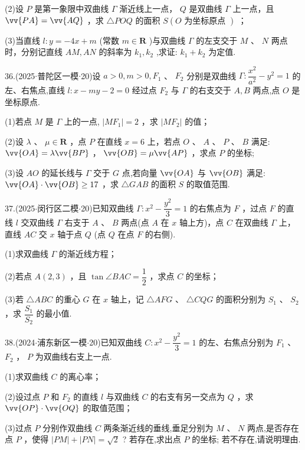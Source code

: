 (2)设 $P$ 是第一象限中双曲线 $\Gamma$ 渐近线上一点， $Q$ 是双曲线 $\Gamma$ 上一点，且 $\vv{PA} = \vv{AQ}$ ，求 $\bigtriangleup  {POQ}$ 的面积 $S\left( {O\text{ 为坐标原点 }}\right)$ ；

(3)当直线 $l : y =  - {4x} + m$ (常数 $m \in  \mathbf{R}$ )与双曲线 $\Gamma$ 的左支交于 $M$ 、 $N$ 两点时，分别记直线 ${AM},{AN}$ 的斜率为 ${k}_{1},{k}_{2}$ ,求证: ${k}_{1} + {k}_{2}$ 为定值.

36.(2025$\cdot$普陀区一模$\cdot$20)设 $a > 0,m > 0,{F}_{1}$ 、 ${F}_{2}$ 分别是双曲线 $\Gamma  : \dfrac{{x}^{2}}{{a}^{2}} - {y}^{2} = 1$ 的左、右焦点,直线 $l : x - {my} - 2 = 0$ 经过点 ${F}_{2}$ 与 $\Gamma$ 的右支交于 $A,B$ 两点,点 $O$ 是坐标原点.

(1)若点 $M$ 是 $\Gamma$ 上的一点, $\left| {M{F}_{1}}\right|  = 2$ ，求 $\left| {M{F}_{2}}\right|$ 的值；

(2)设 $\lambda$ 、 $\mu  \in  \mathbf{R}$ ，点 $P$ 在直线 $x = 6$ 上，若点 $O$ 、 $A$ 、 $P$ 、 $B$ 满足: $\vv{OA} = \lambda \vv{BP}$ ， $\vv{OB} = \mu \vv{AP}$ ，求点 $P$ 的坐标;

(3)设 ${AO}$ 的延长线与 $\Gamma$ 交于 $G$ 点,若向量 $\vv{OA}$ 与 $\vv{OB}$ 满足: $\vv{OA} \cdot  \vv{OB} \geq  {17}$ ，求 $\bigtriangleup  {GAB}$ 的面积 $S$ 的取值范围.

37.(2025$\cdot$闵行区二模$\cdot$20)已知双曲线 $\Gamma  : {x}^{2} - \dfrac{{y}^{2}}{3} = 1$ 的右焦点为 $F$ ，过点 $F$ 的直线 $l$ 交双曲线 $\Gamma$ 右支于 $A$ 、 $B$ 两点(点 $A$ 在 $x$ 轴上方)，点 $C$ 在双曲线 $\Gamma$ 上，直线 ${AC}$ 交 $x$ 轴于点 $Q$ (点 $Q$ 在点 $F$ 的右侧).

(1)求双曲线 $\Gamma$ 的渐近线方程；

(2)若点 $A\left( {2,3}\right)$ ，且 $\tan \angle {BAC} = \dfrac{1}{2}$ ，求点 $C$ 的坐标；

(3)若 $\bigtriangleup  {ABC}$ 的重心 $G$ 在 $x$ 轴上，记 $\bigtriangleup  {AFG}$ 、 $\bigtriangleup  {CQG}$ 的面积分别为 ${S}_{1}$ 、 ${S}_{2}$ ，求 $\dfrac{{S}_{1}}{{S}_{2}}$ 的最小值.

38.(2024$\cdot$浦东新区一模$\cdot$20)已知双曲线 $C : {x}^{2} - \dfrac{{y}^{2}}{3} = 1$ 的左、右焦点分别为 ${F}_{1}$ 、 ${F}_{2}$ ， $P$ 为双曲线右支上一点.

(1)求双曲线 $C$ 的离心率；

(2)设过点 $P$ 和 ${F}_{2}$ 的直线 $l$ 与双曲线 $C$ 的右支有另一交点为 $Q$ ，求 $\vv{OP} \cdot  \vv{OQ}$ 的取值范围；

(3)过点 $P$ 分别作双曲线 $C$ 两条渐近线的垂线,垂足分别为 $M$ 、 $N$ 两点,是否存在点 $P$ ，使得 $\left| {PM}\right|  + \left| {PN}\right|  = \sqrt{2}$ ? 若存在,求出点 $P$ 的坐标; 若不存在,请说明理由.

